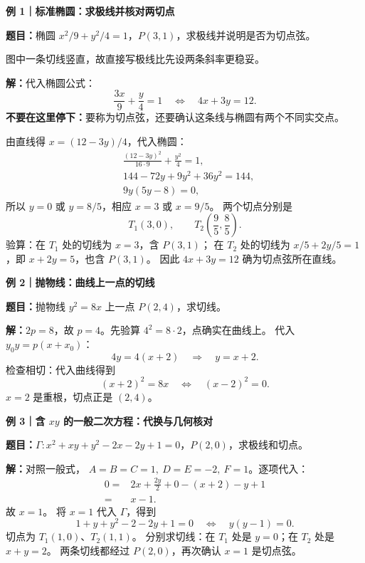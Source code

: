 \begin{examplebox}
\par
\begin{minipage}{\linewidth}
\textbf{\textcolor{CExample}{例 1｜标准椭圆：求极线并核对两切点}}\par\smallskip
\textbf{题目：}椭圆 $x^2/9+y^2/4=1$，$P(3,1)$，求极线并说明是否为切点弦。

\begin{center}

\end{center}
图中一条切线竖直，故直接写极线比先设两条斜率更稳妥。

\end{minipage}
\par
\textbf{解：}代入椭圆公式：
\[
 \frac{3x}{9}+\frac{y}{4}=1
 \quad\Longleftrightarrow\quad\boxed{4x+3y=12}.
\]
\textbf{不要在这里停下：}要称为切点弦，还要确认这条线与椭圆有两个不同实交点。
\par\medskip
由直线得 $x=(12-3y)/4$，代入椭圆：
\begin{align*}
 &\frac{(12-3y)^2}{16\cdot9}+\frac{y^2}{4}=1,\\
 &144-72y+9y^2+36y^2=144,\\
 &9y(5y-8)=0,
\end{align*}
所以 $y=0$ 或 $y=8/5$，相应 $x=3$ 或 $x=9/5$。
两个切点分别是
\[
 T_1(3,0),\qquad T_2\left(\frac95,\frac85\right).
\]
验算：在 $T_1$ 处的切线为 $x=3$，含 $P(3,1)$；
在 $T_2$ 处的切线为 $x/5+2y/5=1$，即 $x+2y=5$，也含 $P(3,1)$。
因此 $4x+3y=12$ 确为切点弦所在直线。

\medskip
\textbf{\textcolor{CExample}{例 2｜抛物线：曲线上一点的切线}}\par\smallskip
\textbf{题目：}抛物线 $y^2=8x$ 上一点 $P(2,4)$，求切线。

\textbf{解：}$2p=8$，故 $p=4$。先验算 $4^2=8\cdot2$，点确实在曲线上。
代入 $y_0y=p(x+x_0)$：
\[
 4y=4(x+2)\quad\Longrightarrow\quad\boxed{y=x+2}.
\]
检查相切：代入曲线得到
\[
 (x+2)^2=8x\quad\Longleftrightarrow\quad(x-2)^2=0.
\]
$x=2$ 是重根，切点正是 $(2,4)$。

\medskip
\textbf{\textcolor{CExample}{例 3｜含 $xy$ 的一般二次方程：代换与几何核对}}\par\smallskip
\textbf{题目：}$\Gamma:x^2+xy+y^2-2x-2y+1=0$，$P(2,0)$，求极线和切点。

\textbf{解：}对照一般式，
$A=B=C=1,\ D=E=-2,\ F=1$。逐项代入：
\begin{align*}
 0={}&2x+\frac{2y}{2}+0-(x+2)-y+1\\
  ={}&x-1.
\end{align*}
故 $\boxed{x=1}$。
将 $x=1$ 代入 $\Gamma$，得到
\[
 1+y+y^2-2-2y+1=0
 \quad\Longleftrightarrow\quad y(y-1)=0.
\]
切点为 $T_1(1,0)$、$T_2(1,1)$。
分别求切线：在 $T_1$ 处是 $y=0$；在 $T_2$ 处是 $x+y=2$。
两条切线都经过 $P(2,0)$，再次确认 $x=1$ 是切点弦。


\end{examplebox}
